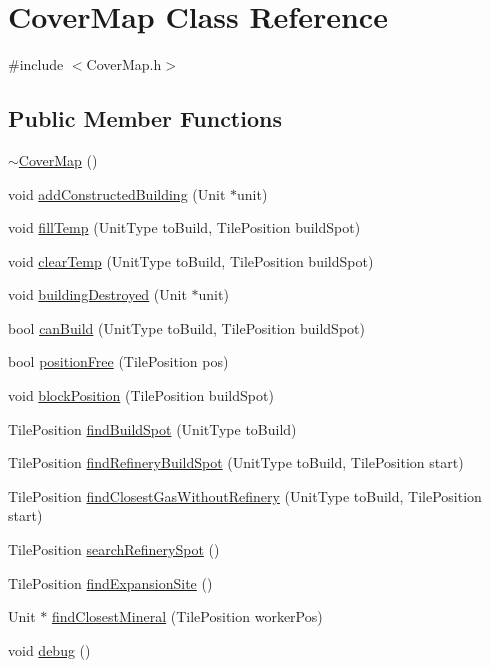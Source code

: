 \hypertarget{class_cover_map}{
\section{CoverMap Class Reference}
\label{class_cover_map}
}


{\ttfamily \#include $<$CoverMap.h$>$}

\subsection*{Public Member Functions}
\begin{DoxyCompactItemize}
\item 
\hyperlink{class_cover_map_ac76348f6ca0eabb8836bea9692065dc9}{$\sim$CoverMap} ()
\item 
void \hyperlink{class_cover_map_ae6d2e12a52e2ad902ead0e19bf3c5c6f}{addConstructedBuilding} (Unit $\ast$unit)
\item 
void \hyperlink{class_cover_map_ab98feb5027869307d10778b5b5cb41cc}{fillTemp} (UnitType toBuild, TilePosition buildSpot)
\item 
void \hyperlink{class_cover_map_aea7ff0bf5b6ea6e2f41cf2d2d5c01b85}{clearTemp} (UnitType toBuild, TilePosition buildSpot)
\item 
void \hyperlink{class_cover_map_a18440b76633fafcb66d53f281b6ba29e}{buildingDestroyed} (Unit $\ast$unit)
\item 
bool \hyperlink{class_cover_map_a900bc7d4f09fbbe3f594d6be14ff0ed8}{canBuild} (UnitType toBuild, TilePosition buildSpot)
\item 
bool \hyperlink{class_cover_map_ac899fce8c1d35baa45c5d277867dd743}{positionFree} (TilePosition pos)
\item 
void \hyperlink{class_cover_map_a4e8d06ef538d1e3187066ee1c192453c}{blockPosition} (TilePosition buildSpot)
\item 
TilePosition \hyperlink{class_cover_map_a1e655d9c172d0bb84ae6f4daa24cdb95}{findBuildSpot} (UnitType toBuild)
\item 
TilePosition \hyperlink{class_cover_map_a850a386ca7671d099d5f18c51fe589be}{findRefineryBuildSpot} (UnitType toBuild, TilePosition start)
\item 
TilePosition \hyperlink{class_cover_map_a27f8ac5aa64bd32f643cfdfa26a4b347}{findClosestGasWithoutRefinery} (UnitType toBuild, TilePosition start)
\item 
TilePosition \hyperlink{class_cover_map_afa09fc30a8eca398d334603ad94ca17c}{searchRefinerySpot} ()
\item 
TilePosition \hyperlink{class_cover_map_ab5676549181f2ec7d5584d833c9aea3a}{findExpansionSite} ()
\item 
Unit $\ast$ \hyperlink{class_cover_map_a209b7480d6fbcd7c652352fbfef46157}{findClosestMineral} (TilePosition workerPos)
\item 
void \hyperlink{class_cover_map_af0b838bc7bb46e2f310015b00ae7e5b4}{debug} ()
\end{DoxyCompactItemize}

